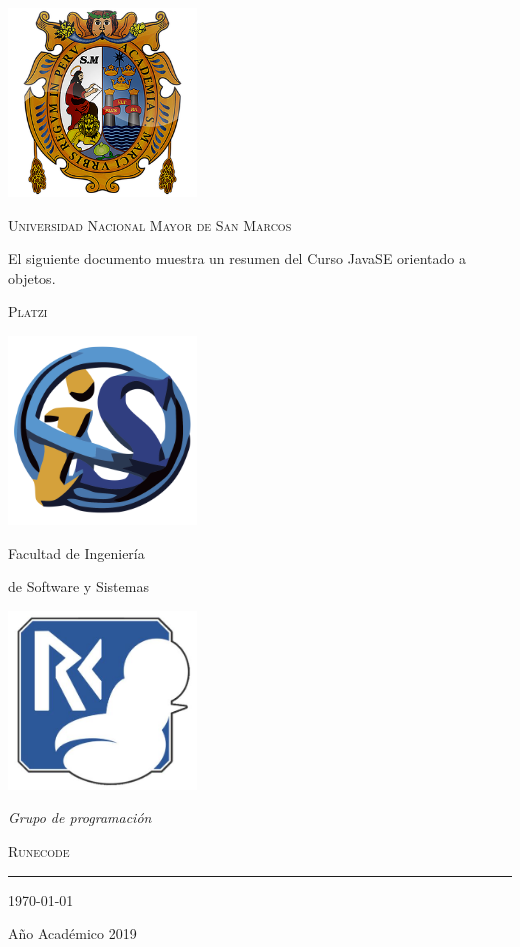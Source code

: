 \documentclass[a4paper,12pt]{book}
\begin{document}
\begin{titlepage}
	\vspace*{-3cm}
	\centering
		\includegraphics[width=5cm]{./escudo_UNMSM.png}
    

	{\scshape\LARGE Universidad Nacional Mayor de San Marcos\par}

	\vspace{1cm}

  {\large El siguiente documento muestra un resumen del Curso JavaSE
   orientado a objetos.}

	\vspace{.1\textheight}
  { \LARGE \scshape Platzi}

	\vspace{.07\textheight}

	\parbox{.4\linewidth}{
			\includegraphics[width=5cm]{./escudo_FISI.png}\par
			{Facultad de Ingeniería\par
			de Software y Sistemas}
		}\hfill
	\parbox{.5\linewidth}{
		\raggedleft
			\includegraphics[width=5cm]{./captura.jpg}\par
			\emph{Grupo de programación}\par
			\textsc{Runecode}%
	}

		\vspace{.1\linewidth}

			\vfill

			\rule{.4\textwidth}{.4pt}

	{\large \today\par
	Año Académico 2019\par}

\end{titlepage}
\end{document}
